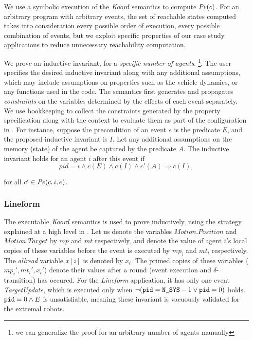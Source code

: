 We use a symbolic execution of the $\emph{Koord}$ semantics to compute $\mathit{Pe}(c)$. For an arbitrary program with arbitrary events, the set of reachable states computed takes into consideration every possible order of execution, every possible combination of events, but we exploit specific properties of our case study applications to reduce unnecessary reachability computation. 

     We prove an inductive invariant, for a \emph{specific number of agents}. \footnote{we can generalize the proof for an arbitrary number of agents manually}. The user specifies the desired inductive invariant along with any additional assumptions, which may include assumptions on properties such as the vehicle dynamics, or any functions used in the code. The semantics first generates and propagates \emph{constraints} on the variables determined by the effects of each event separately. We use bookkeeping to collect the constraints generated by the property specification along with the context to evaluate them as part of the configuration in \K. For instance, suppose the precondition of an event $e$ is the predicate $E$, and the proposed inductive invariant is $I$. Let any additional assumptions on the memory (state) of the agent be captured by the predicate $A$. The inductive invariant holds for an agent $i$ after this event if
            $$\mathit{pid} = i \wedge c(E)\wedge c(I)\wedge c'(A)\Rightarrow c(I),$$

for all $c' \in \mathit{Pe}(c,i,e)$.




\subsubsection*{Lineform}
The executable $\emph{Koord}$ semantics is used to prove  inductively, using the strategy explained at a high level in . Let us denote the variables $\mathit{Motion.Position}$ and $\mathit{Motion.Target}$ by $\mathit{mp}$ and $\mathit{mt}$ respectively,  and denote the value of agent $i$'s local copies of these variables before the event is executed by $\mathit{mp}_i$ and $\mathit{mt}_i$ respectively. The \emph{allread} variable $x[i]$ is denoted by $x_i$. The primed copies of these variables ($\mathit{mp_i', mt_i',x_i'}$) denote their values after a round (event execution and $\delta$-transition) has occured. For the \emph{Lineform} application, it has only one event \emph{TargetUpdate}, which is executed only when $\neg (\texttt{pid} = \texttt{N\_SYS} - 1 \vee \texttt{pid} = 0)$ holds. $\texttt{pid} = 0 \wedge E$ is unsatisfiable, meaning these invariant is vacuously validated for the extremal robots.


